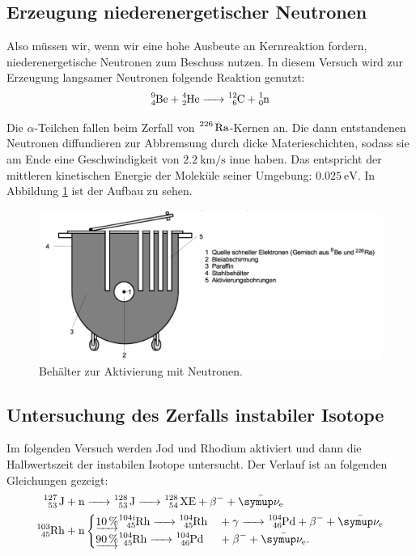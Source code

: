 \subsection{Erzeugung niederenergetischer Neutronen}

Also müssen wir, wenn wir eine hohe Ausbeute an Kernreaktion fordern, niederenergetische
Neutronen zum Beschuss nutzen.
In diesem Versuch wird zur Erzeugung langsamer Neutronen folgende Reaktion
genutzt:
\begin{equation}
  \ce{^9_4Be + ^4_2He -> ^12_6C + ^1_0n}
\end{equation}

Die $\alpha$-Teilchen fallen beim Zerfall von $\ce{^226 Ra}$-Kernen an.
Die dann entstandenen Neutronen diffundieren zur Abbremsung durch dicke
Materieschichten, sodass sie am Ende eine Geschwindigkeit von $\SI{2.2}{\kilo\meter\per\second}$
inne haben. Das entspricht der mittleren kinetischen Energie der Moleküle
seiner Umgebung: $\SI{0.025}{\electronvolt}$.
In Abbildung \ref{fig:aktivierung} ist der Aufbau zu sehen.

\begin{figure}[h]
  \centering
  \includegraphics[width = \textwidth]{Pics/aktivierungsbehaelter.pdf}
  \caption{Behälter zur Aktivierung mit Neutronen.\cite{anleitung}}
  \label{fig:aktivierung}
\end{figure}


\subsection{Untersuchung des Zerfalls instabiler Isotope}

Im folgenden Versuch werden Jod und Rhodium aktiviert und dann die Halbwertszeit
der instabilen Isotope untersucht. Der Verlauf ist an folgenden Gleichungen
gezeigt:
\begin{align}
  \ce{^127_53 J + n&-> ^128_53 J -> ^128_54 XE + \beta^- + \bar{\g{\nu}_e}}\\
  \ce{^103_45Rh + n&}
  \begin{cases}
    \underrightarrow{\SI{10}{\percent}} \ce{^{104i}_45Rh -> ^104_45Rh &+ \text{$\gamma$} -> ^104_46Pd + \beta^- + \bar{\g{\nu}_e}}\\
    \underrightarrow{\SI{90}{\percent}} \ce{^104_45Rh -> ^104_46Pd &+ \beta^- + \bar{\g{\nu}_e}}.
  \end{cases}\label{eqn:zerfrho}
\end{align}

